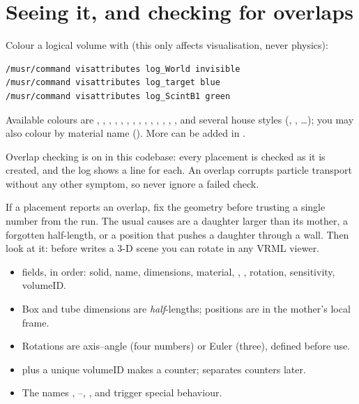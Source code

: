 \section{Seeing it, and checking for overlaps}
\label{sec:seeit}
Colour a logical volume with  (this only affects visualisation, never physics):

\begin{lstlisting}[style=mac,caption={Colours for visualisation}]
/musr/command visattributes log_World invisible
/musr/command visattributes log_target blue
/musr/command visattributes log_ScintB1 green
\end{lstlisting}

Available colours are , , , , , , , , , , , , , , and several house styles (, , \dots); you may also colour by material name (). More can be added in .

Overlap checking is on in this codebase: every placement is checked as it is created, and the log shows a line  for each. An overlap corrupts particle transport without any other symptom, so never ignore a failed check.

\begin{checkbuild}
If a placement reports an overlap, fix the geometry before trusting a single number from the run. The usual causes are a daughter larger than its mother, a forgotten half-length, or a position that pushes a daughter through a wall. Then look at it:  before  writes a 3-D scene you can rotate in any VRML viewer.
\end{checkbuild}

\begin{recap}
\begin{itemize}
  \item {} fields, in order: solid, name, dimensions, material, , , rotation, sensitivity, volumeID.
  \item Box and tube dimensions are \emph{half}-lengths; positions are in the mother's local frame.
  \item Rotations are axis--angle (four numbers) or Euler (three), defined before use.
  \item {} plus a unique volumeID makes a counter;  separates counters later.
  \item The names , --, ,  and  trigger special behaviour.
\end{itemize}
\end{recap}
